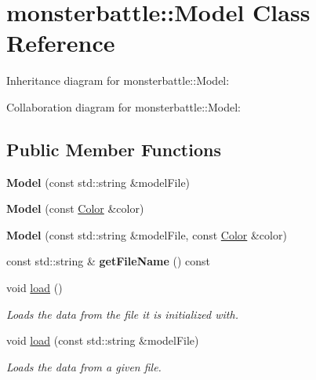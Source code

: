 \hypertarget{classmonsterbattle_1_1Model}{}\section{monsterbattle\+:\+:Model Class Reference}
\label{classmonsterbattle_1_1Model}


Inheritance diagram for monsterbattle\+:\+:Model\+:


Collaboration diagram for monsterbattle\+:\+:Model\+:
\subsection*{Public Member Functions}
\begin{DoxyCompactItemize}
\item 
\mbox{\label{classmonsterbattle_1_1Model_af97dd06a21de8e6514a46fddce50638f}} 
{\bfseries Model} (const std\+::string \&model\+File)
\item 
\mbox{\label{classmonsterbattle_1_1Model_ae356a793e4f034c71ca9b6ede90db6be}} 
{\bfseries Model} (const \hyperlink{structmonsterbattle_1_1Color}{Color} \&color)
\item 
\mbox{\label{classmonsterbattle_1_1Model_a57eeba855f5a37a03767f42daf8d0361}} 
{\bfseries Model} (const std\+::string \&model\+File, const \hyperlink{structmonsterbattle_1_1Color}{Color} \&color)
\item 
\mbox{\label{classmonsterbattle_1_1Model_a9e14e50a65eb348fee4016f45983c0f3}} 
const std\+::string \& {\bfseries get\+File\+Name} () const
\item 
void \hyperlink{classmonsterbattle_1_1Model_a3c62f10cd50abeaa2ec6a76b7810c94a}{load} ()
\begin{DoxyCompactList}\small\item\em Loads the data from the file it is initialized with. \end{DoxyCompactList}\item 
void \hyperlink{classmonsterbattle_1_1Model_a379ea5c7c9d5d1ae0a1a8cec76b1c0d9}{load} (const std\+::string \&model\+File)
\begin{DoxyCompactList}\small\item\em Loads the data from a given file. \end{DoxyCompactList}\end{DoxyCompactItemize}
